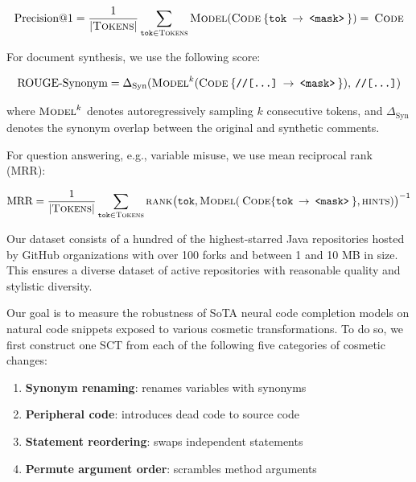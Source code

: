 \documentclass[usenames,dvipsnames]{article} %
\begin{document}
\begin{equation}
  \text{Precision@1} = \frac{1}{{|\textsc{Tokens}|}}\sum_{\texttt{tok}\in \textsc{Tokens}}\textsc{Model}(\textsc{Code}\:\{\texttt{tok}\:\rightarrow\:\texttt{<mask>}\:\}) = \:\textsc{Code}
\end{equation}

  For document synthesis, we use the following score:

\begin{equation}
\text{ROUGE-Synonym} = \Delta_{\text{Syn}}(\textsc{Model}^{k}(\textsc{Code}\:\{\texttt{//[...]}\:\rightarrow\:\texttt{<mask>}\:\}), \:\texttt{//[...]})
\end{equation}

  where $\textsc{Model}^{k}$ denotes autoregressively sampling $k$ consecutive tokens, and $\Delta_\text{Syn}$ denotes the synonym overlap between the original and synthetic comments.

  For question answering, e.g., variable misuse, we use mean reciprocal rank (MRR):

\begin{equation}
\text{MRR} = \frac{1}{|\textsc{Tokens}|} \sum_{\texttt{tok}\in\textsc{Tokens}} \textsc{rank}\big(\texttt{tok}, \textsc{Model}(\:\textsc{Code}\{\texttt{tok}\:\rightarrow\:\texttt{<mask>}\:\}, \textsc{hints})\big)^{-1}
\end{equation}

  Our dataset consists of a hundred of the highest-starred Java repositories hosted by GitHub organizations with over 100 forks and between 1 and 10 MB in size. This ensures a diverse dataset of active repositories with reasonable quality and stylistic diversity.

  Our goal is to measure the robustness of SoTA neural code completion models on natural code snippets exposed to various cosmetic transformations. To do so, we first construct one SCT from each of the following five categories of cosmetic changes:

  \begin{enumerate}[itemsep=1ex]
    \item \textbf{Synonym renaming}: renames variables with synonyms
    \item \textbf{Peripheral code}: introduces dead code to source code
    \item \textbf{Statement reordering}: swaps independent statements
    \item \textbf{Permute argument order}: scrambles method arguments
  \end{enumerate}
\end{document}
